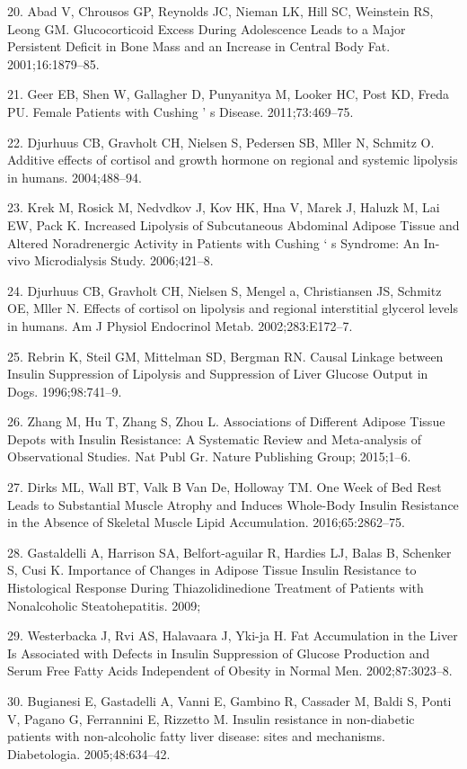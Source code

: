 \documentclass[11pt]{article} %
\begin{document}
20. Abad V, Chrousos GP, Reynolds JC, Nieman LK, Hill SC, Weinstein RS,
Leong GM. Glucocorticoid Excess During Adolescence Leads to a Major
Persistent Deficit in Bone Mass and an Increase in Central Body Fat.
2001;16:1879--85.

21. Geer EB, Shen W, Gallagher D, Punyanitya M, Looker HC, Post KD,
Freda PU. Female Patients with Cushing ' s Disease. 2011;73:469--75.

22. Djurhuus CB, Gravholt CH, Nielsen S, Pedersen SB, Mller N, Schmitz
O. Additive effects of cortisol and growth hormone on regional and
systemic lipolysis in humans. 2004;488--94.

23. Krek M, Rosick M, Nedvdkov J, Kov HK, Hna V, Marek J, Haluzk
M, Lai EW, Pack K. Increased Lipolysis of Subcutaneous Abdominal
Adipose Tissue and Altered Noradrenergic Activity in Patients with
Cushing ` s Syndrome: An In-vivo Microdialysis Study. 2006;421--8.

24. Djurhuus CB, Gravholt CH, Nielsen S, Mengel a, Christiansen JS,
Schmitz OE, Mller N. Effects of cortisol on lipolysis and regional
interstitial glycerol levels in humans. Am J Physiol Endocrinol Metab.
2002;283:E172--7.

25. Rebrin K, Steil GM, Mittelman SD, Bergman RN. Causal Linkage between
Insulin Suppression of Lipolysis and Suppression of Liver Glucose Output
in Dogs. 1996;98:741--9.

26. Zhang M, Hu T, Zhang S, Zhou L. Associations of Different Adipose
Tissue Depots with Insulin Resistance: A Systematic Review and
Meta-analysis of Observational Studies. Nat Publ Gr. Nature Publishing
Group; 2015;1--6.

27. Dirks ML, Wall BT, Valk B Van De, Holloway TM. One Week of Bed Rest
Leads to Substantial Muscle Atrophy and Induces Whole-Body Insulin
Resistance in the Absence of Skeletal Muscle Lipid Accumulation.
2016;65:2862--75.

28. Gastaldelli A, Harrison SA, Belfort-aguilar R, Hardies LJ, Balas B,
Schenker S, Cusi K. Importance of Changes in Adipose Tissue Insulin
Resistance to Histological Response During Thiazolidinedione Treatment
of Patients with Nonalcoholic Steatohepatitis. 2009;

29. Westerbacka J, Rvi AS, Halavaara J, Yki-ja H. Fat Accumulation in
the Liver Is Associated with Defects in Insulin Suppression of Glucose
Production and Serum Free Fatty Acids Independent of Obesity in Normal
Men. 2002;87:3023--8.

30. Bugianesi E, Gastadelli A, Vanni E, Gambino R, Cassader M, Baldi S,
Ponti V, Pagano G, Ferrannini E, Rizzetto M. Insulin resistance in
non-diabetic patients with non-alcoholic fatty liver disease: sites and
mechanisms. Diabetologia. 2005;48:634--42.
\end{document}
